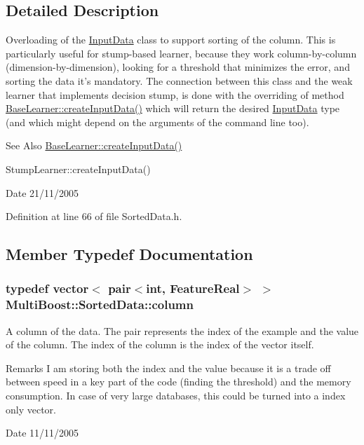 \subsection{Detailed Description}
Overloading of the \hyperlink{classMultiBoost_1_1InputData}{Input\-Data} class to support sorting of the column. This is particularly useful for stump-\/based learner, because they work column-\/by-\/column (dimension-\/by-\/dimension), looking for a threshold that minimizes the error, and sorting the data it's mandatory. The connection between this class and the weak learner that implements decision stump, is done with the overriding of method \hyperlink{classMultiBoost_1_1BaseLearner_aa6bce26112ef2ce1275385d06467a9a9}{Base\-Learner\-::create\-Input\-Data()} which will return the desired \hyperlink{classMultiBoost_1_1InputData}{Input\-Data} type (and which might depend on the arguments of the command line too). \begin{DoxySeeAlso}{See Also}
\hyperlink{classMultiBoost_1_1BaseLearner_aa6bce26112ef2ce1275385d06467a9a9}{Base\-Learner\-::create\-Input\-Data()} 

Stump\-Learner\-::create\-Input\-Data() 
\end{DoxySeeAlso}
\begin{DoxyDate}{Date}
21/11/2005 
\end{DoxyDate}


Definition at line 66 of file Sorted\-Data.\-h.



\subsection{Member Typedef Documentation}
\hypertarget{classMultiBoost_1_1SortedData_a56ab0bfd37309f0a9fcb00eb4feee18e}{
\subsubsection[{column}]{\setlength{\rightskip}{0pt plus 5cm}typedef vector$<$ pair$<$int, {\bf Feature\-Real}$>$ $>$ {\bf Multi\-Boost\-::\-Sorted\-Data\-::column}\hspace{0.3cm}{\ttfamily [protected]}}}\label{classMultiBoost_1_1SortedData_a56ab0bfd37309f0a9fcb00eb4feee18e}
A column of the data. The pair represents the index of the example and the value of the column. The index of the column is the index of the vector itself. \begin{DoxyRemark}{Remarks}
I am storing both the index and the value because it is a trade off between speed in a key part of the code (finding the threshold) and the memory consumption. In case of very large databases, this could be turned into a index only vector. 
\end{DoxyRemark}
\begin{DoxyDate}{Date}
11/11/2005 
\end{DoxyDate}


